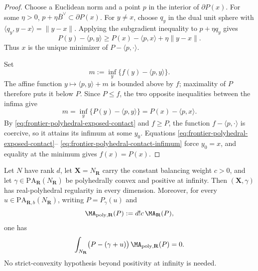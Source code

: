 \begin{proof}
Choose a Euclidean norm and a point \(p\) in the interior of
\(\partial P(x)\).  For some \(\eta>0\),
\(p+\eta\overline B^\vee\subset\partial P(x)\).  For \(y\ne x\), choose
\(q_y\) in the dual unit sphere with
\(\langle q_y,y-x\rangle=\lVert y-x\rVert\).  Applying the subgradient
inequality to \(p+\eta q_y\) gives
\begin{equation}
 P(y)-\langle p,y\rangle
 \geq P(x)-\langle p,x\rangle+\eta\lVert y-x\rVert.
 \label{eq:frontier-polyhedral-exposed-contact}
\end{equation}
Thus \(x\) is the unique minimizer of
\(P-\langle p,\cdot\rangle\).

Set
\[
                 m:=\inf_y\{f(y)-\langle p,y\rangle\}.
\]
The affine function \(y\mapsto\langle p,y\rangle+m\) is bounded above by
\(f\); maximality of \(P\) therefore puts it below \(P\).  Since
\(P\leq f\), the two opposite inequalities between the infima give
\begin{equation}
 m=\inf_y\{P(y)-\langle p,y\rangle\}
  =P(x)-\langle p,x\rangle.
 \label{eq:frontier-polyhedral-contact-infimum}
\end{equation}
By \eqref{eq:frontier-polyhedral-exposed-contact} and \(f\geq P\), the
function \(f-\langle p,\cdot\rangle\) is coercive, so it attains its
infimum at some \(y_0\).  Equations
\eqref{eq:frontier-polyhedral-exposed-contact}--
\eqref{eq:frontier-polyhedral-contact-infimum} force \(y_0=x\), and equality
at the minimum gives \(f(x)=P(x)\).
\end{proof}

\begin{theorem}\label{thm:frontier-polyhedral-affine-orthogonality}
Let \(N\) have rank \(d\), let
\(\mathbf X=N_{\mathbf R}\) carry the constant balancing weight
\(c>0\), and let
\(\gamma\in\mathrm{PA}_{\mathbf R}(N_{\mathbf R})\) be polyhedrally
convex and positive at infinity.  Then
\((\mathbf X,\gamma)\) has real-polyhedral regularity in every dimension.
Moreover, for every \(u\in\mathrm{PA}_{\mathbf R,b}(N_{\mathbf R})\),
writing \(P=P_\gamma(u)\) and
\[
             \MA_{\mathrm{poly},\mathbf R}(P)
             :=d!c\,\MA_{\mathbf R}(P),
\]
one has
\[
 \int_{N_{\mathbf R}}
 \bigl(P-(\gamma+u)\bigr)\,
 \MA_{\mathrm{poly},\mathbf R}(P)=0.
\]
No strict-convexity hypothesis beyond positivity at infinity is needed.
\end{theorem}

